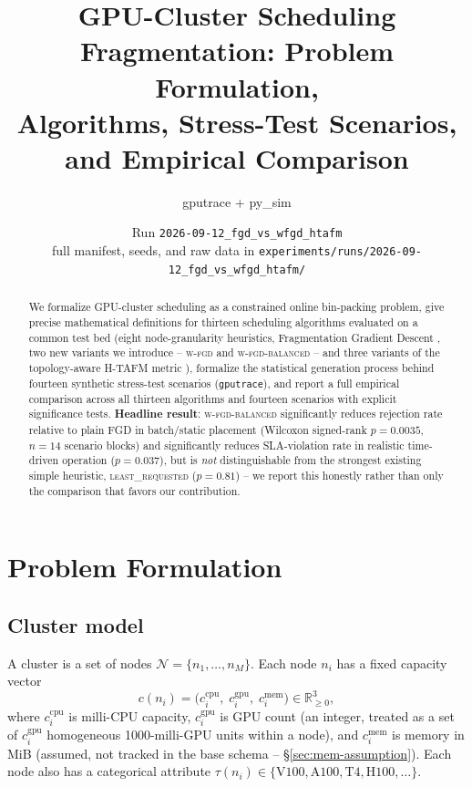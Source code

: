 \documentclass[11pt]{article}
\title{GPU-Cluster Scheduling Fragmentation: Problem Formulation,\\
Algorithms, Stress-Test Scenarios, and Empirical Comparison}
\author{gputrace + py\_sim}
\date{Run \texttt{2026-09-12\_fgd\_vs\_wfgd\_htafm} \\ \small full manifest, seeds, and raw data in \texttt{experiments/runs/2026-09-12\_fgd\_vs\_wfgd\_htafm/}}
\newcommand{\R}{\mathbb{R}}
\newcommand{\N}{\mathcal{N}}
\begin{document}
\maketitle

\begin{abstract}
We formalize GPU-cluster scheduling as a constrained online bin-packing
problem, give precise mathematical definitions for thirteen scheduling
algorithms evaluated on a common test bed (eight node-granularity
heuristics, Fragmentation Gradient Descent \cite{fgd}, two new variants we
introduce -- \textsc{w-fgd} and \textsc{w-fgd-balanced} -- and three
variants of the topology-aware H-TAFM metric \cite{fgd,defrag,hypergraph_survey,partitioning_hard,binpacking_survey}),
formalize the statistical generation process behind fourteen synthetic
stress-test scenarios (\texttt{gputrace}), and report a full empirical
comparison across all thirteen algorithms and fourteen scenarios with
explicit significance tests. \textbf{Headline result}: \textsc{w-fgd-balanced}
significantly reduces rejection rate relative to plain FGD in batch/static
placement (Wilcoxon signed-rank $p=0.0035$, $n=14$ scenario blocks) and
significantly reduces SLA-violation rate in realistic time-driven operation
($p=0.037$), but is \emph{not} distinguishable from the strongest existing
simple heuristic, \textsc{least\_requested} ($p=0.81$) -- we report this
honestly rather than only the comparison that favors our contribution.
\end{abstract}

\tableofcontents

\section{Problem Formulation}

\subsection{Cluster model}
A cluster is a set of nodes $\N = \{n_1, \dots, n_M\}$. Each node $n_i$ has
a fixed capacity vector
\[
  c(n_i) = \big(c^{\text{cpu}}_i,\; c^{\text{gpu}}_i,\; c^{\text{mem}}_i\big) \in \R_{\geq0}^3,
\]
where $c^{\text{cpu}}_i$ is milli-CPU capacity, $c^{\text{gpu}}_i$ is GPU
count (an integer, treated as a set of $c^{\text{gpu}}_i$ homogeneous
1000-milli-GPU units within a node), and $c^{\text{mem}}_i$ is memory in
MiB (assumed, not tracked in the base schema -- \S\ref{sec:mem-assumption}).
Each node also has a categorical attribute $\tau(n_i) \in \{\text{V100},
\text{A100}, \text{T4}, \text{H100}, \dots\}$.
\end{document}
